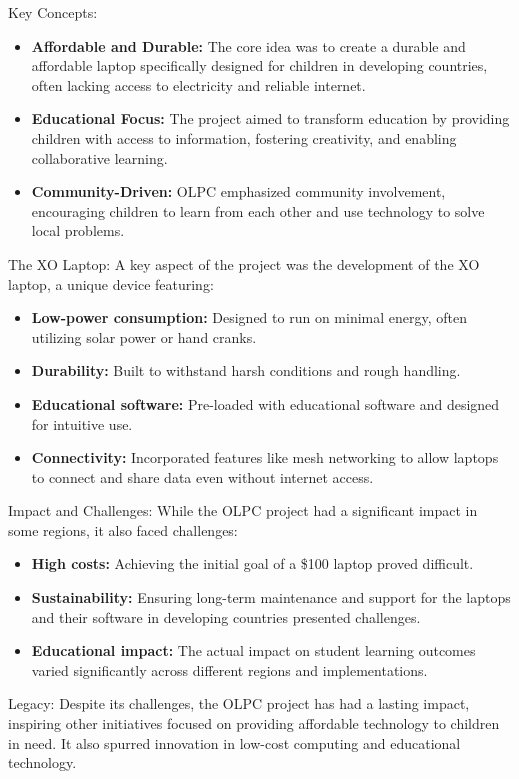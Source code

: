 \documentclass[a4paper,11pt]{article}
\begin{document}
{Key Concepts:}
\begin{itemize}
	\item \textbf{Affordable and Durable:}
	 The core idea was to create a durable and affordable laptop specifically designed for children in developing countries, often lacking access to electricity and reliable internet.
	\item \textbf{Educational Focus:}
	 The project aimed to transform education by providing children with access to information, fostering creativity, and enabling collaborative learning.
	\item \textbf{Community-Driven:}
	 OLPC emphasized community involvement, encouraging children to learn from each other and use technology to solve local problems.
\end{itemize}

{The XO Laptop:}
A key aspect of the project was the development of the XO laptop, a unique device featuring:
\begin{itemize}
	\item \textbf{Low-power consumption:}
	 Designed to run on minimal energy, often utilizing solar power or hand cranks.
	\item \textbf{Durability:}
	 Built to withstand harsh conditions and rough handling.
	\item \textbf{Educational software:}
	 Pre-loaded with educational software and designed for intuitive use.
	\item \textbf{Connectivity:}
	 Incorporated features like mesh networking to allow laptops to connect and share data even without internet access.
\end{itemize}

{Impact and Challenges:}
While the OLPC project had a significant impact in some regions, it also faced challenges:
\begin{itemize}
	\item \textbf{High costs:}
	 Achieving the initial goal of a \$100 laptop proved difficult.
	\item \textbf{Sustainability:}
	 Ensuring long-term maintenance and support for the laptops and their software in developing countries presented challenges.
	\item \textbf{Educational impact:}
	 The actual impact on student learning outcomes varied significantly across different regions and implementations.
\end{itemize}

{Legacy:}
Despite its challenges, the OLPC project has had a lasting impact, inspiring other initiatives focused on providing affordable technology to children in need. It also spurred innovation in low-cost computing and educational technology.
\end{document}
